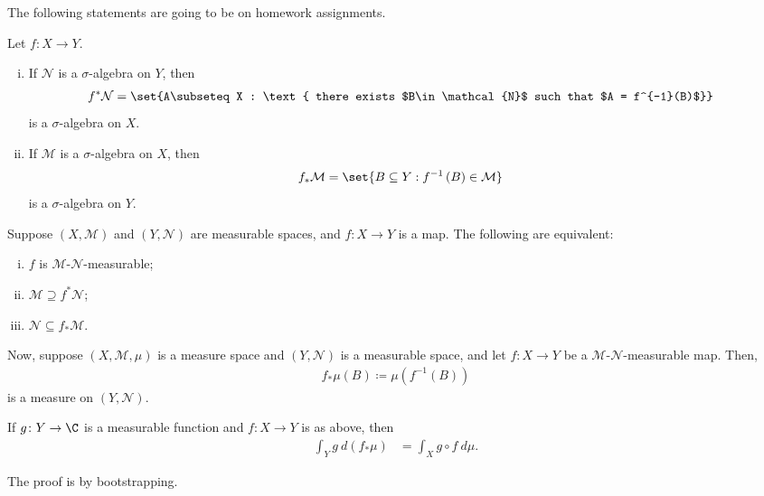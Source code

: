 \documentclass[10pt]{mypackage}
\renewcommand{\coloneq}{\coloneqq}
\begin{document}
The following statements are going to be on homework assignments.
\begin{proposition}
  Let $f\colon X\to Y$.  
  \begin{enumerate}[(i)]
    \item If $ \mathcal{N} $ is a $\sigma$-algebra on $Y$, then
      \begin{align*}
        f^{\ast}\mathcal{N} &= \set{A\subseteq X : \text{ there exists $B\in \mathcal{N}$ such that $A = f^{-1}(B)$}}
      \end{align*}
      is a $\sigma$-algebra on $X$.
    \item If $ \mathcal{M} $ is a $\sigma$-algebra on $X$, then
      \begin{align*}
        f_{\ast}\mathcal{M} &= \set{B\subseteq Y : f^{-1}\left( B \right)\in \mathcal{M}}
      \end{align*}
      is a $\sigma$-algebra on $Y$.
  \end{enumerate}
\end{proposition}
\begin{proposition}
  Suppose $\left( X,\mathcal{M} \right)$ and $\left( Y,\mathcal{N} \right)$ are measurable spaces, and $f\colon X\to Y$ is a map. The following are equivalent:
  \begin{enumerate}[(i)]
    \item $f$ is $\mathcal{M}$-$\mathcal{N}$-measurable;
    \item $\mathcal{M}\supseteq f^{\ast}\mathcal{N}$;
    \item $\mathcal{N}\subseteq f_{\ast}\mathcal{M}$.
  \end{enumerate}
  Now, suppose $\left( X,\mathcal{M},\mu \right)$ is a measure space and $\left( Y,\mathcal{N} \right)$ is a measurable space, and let $f\colon X\to Y$ be a $\mathcal{M}$-$\mathcal{N}$-measurable map. Then,
  \begin{align*}
    f_{\ast}\mu\left( B \right) \coloneq \mu\left( f^{-1}(B) \right)
  \end{align*}
  is a measure on $ \left( Y,\mathcal{N} \right) $.
\end{proposition}
\begin{theorem}
  If $g\colon Y\to \C$ is a measurable function and $f\colon X\to Y$ is as above, then
  \begin{align*}
    \int_{Y}^{} g\:d\left( f_{\ast}\mu \right) &= \int_{X}^{} g\circ f\:d\mu.
  \end{align*}
\end{theorem}
The proof is by bootstrapping.
\end{document}
